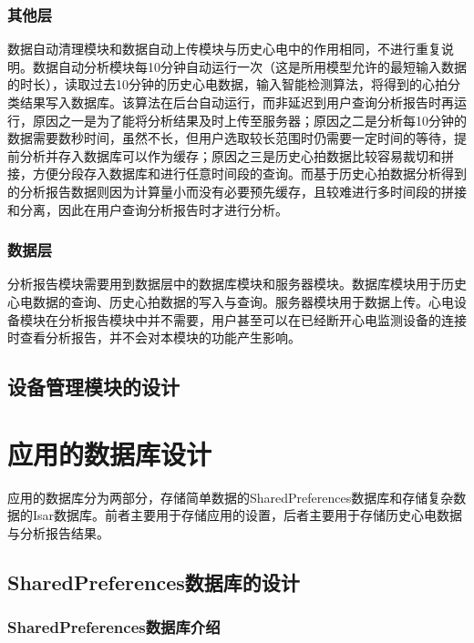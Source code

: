 \subsubsection{其他层}

数据自动清理模块和数据自动上传模块与历史心电中的作用相同，不进行重复说明。数据自动分析模块每10分钟自动运行一次（这是所用模型允许的最短输入数据的时长），读取过去10分钟的历史心电数据，输入智能检测算法，将得到的心拍分类结果写入数据库。该算法在后台自动运行，而非延迟到用户查询分析报告时再运行，原因之一是为了能将分析结果及时上传至服务器；原因之二是分析每10分钟的数据需要数秒时间，虽然不长，但用户选取较长范围时仍需要一定时间的等待，提前分析并存入数据库可以作为缓存；原因之三是历史心拍数据比较容易裁切和拼接，方便分段存入数据库和进行任意时间段的查询。而基于历史心拍数据分析得到的分析报告数据则因为计算量小而没有必要预先缓存，且较难进行多时间段的拼接和分离，因此在用户查询分析报告时才进行分析。

\subsubsection{数据层}

分析报告模块需要用到数据层中的数据库模块和服务器模块。数据库模块用于历史心电数据的查询、历史心拍数据的写入与查询。服务器模块用于数据上传。心电设备模块在分析报告模块中并不需要，用户甚至可以在已经断开心电监测设备的连接时查看分析报告，并不会对本模块的功能产生影响。

\subsection{设备管理模块的设计}\label{subsec:device-design}



\section{应用的数据库设计}\label{sec:db-design}

应用的数据库分为两部分，存储简单数据的SharedPreferences数据库和存储复杂数据的Isar数据库。前者主要用于存储应用的设置，后者主要用于存储历史心电数据与分析报告结果。

\subsection{SharedPreferences数据库的设计}\label{subsec:shared-preferences}

\subsubsection{SharedPreferences数据库介绍}\label{subsubsec:shared-preferences-intro}

